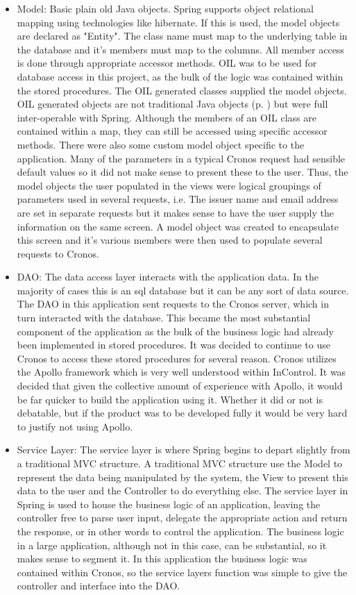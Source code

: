 \documentclass[a4paper, 11pt, titlepage]{article}
\begin{document}
\begin{itemize}
\item Model: Basic plain old Java objects. Spring supports object relational mapping using technologies like hibernate. If this is used, the model objects are declared as "Entity". The class name must map to the underlying table in the database and it's members must map to the columns. All member access is done through appropriate accessor methods.
OIL was to be used for database access in this project, as the bulk of the logic was contained within the stored procedures. The OIL generated classes supplied the model objects. OIL generated objects are not traditional Java objects (p. \pageref{metadata}) but were full inter-operable with Spring. Although the members of an OIL class are contained within a map, they can still be accessed using specific accessor methods.
There were also some custom model object specific to the application. Many of the parameters in a typical Cronos request had sensible default values so it did not make sense to present these to the user. Thus, the model objects the user populated in the views were logical groupings of parameters used in several requests, i.e. The issuer name and email address are set in separate requests but it makes sense to have the user supply the information on the same screen. A model object was created to encapsulate this screen and it's various members were then used to populate several requests to Cronos.
\item DAO: The data access layer interacts with the application data. In the majority of cases this is an sql database but it can be any sort of data source. The DAO in this application sent requests to the Cronos server, which in turn interacted with the database. This became the most substantial component of the application as the bulk of the business logic had already been implemented in stored procedures. It was decided to continue to use Cronos to access these stored procedures for several reason. Cronos utilizes the Apollo framework which is very well understood within InControl. It was decided that given the collective amount of experience with Apollo, it would be far quicker to build the application using it. Whether it did or not is debatable, but if the product was to be developed fully it would be very hard to justify not using Apollo.
\item Service Layer: The service layer is where Spring begins to depart slightly from a traditional MVC structure. A traditional MVC structure use the Model to represent the data being manipulated by the system, the View to present this data to the user and the Controller to do everything else. The service layer in Spring is used to house the business logic of an application, leaving the controller free to parse user input, delegate the appropriate action and return the response, or in other words to control the application. The business logic in a large application, although not in this case, can be substantial, so it makes sense to segment it. In this application the business logic was contained within Cronos, so the service layers function was simple to give the controller and interface into the DAO.

\end{itemize}
\end{document}

